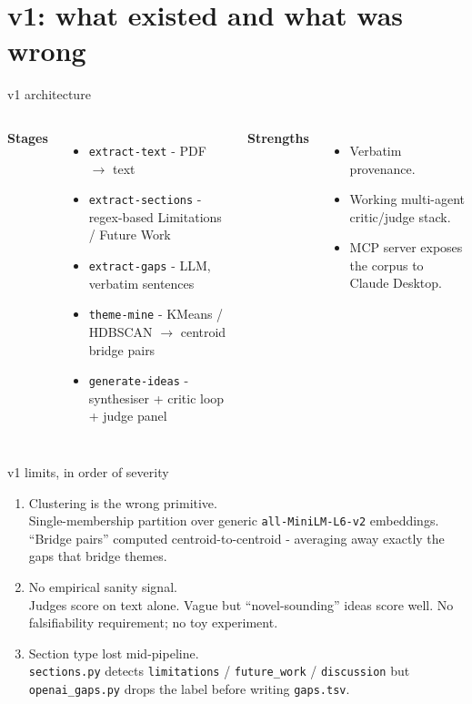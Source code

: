 \documentclass[10pt,aspectratio=169]{beamer}
\newcommand{\filename}[1]{\texttt{\small#1}}
\begin{document}

\section{v1: what existed and what was wrong}

\begin{frame}{v1 architecture}
  \begin{columns}[T]
      \textbf{Stages}
      \begin{itemize}
        \item \filename{extract-text} - PDF $\to$ text
        \item \filename{extract-sections} - regex-based Limitations / Future Work
        \item \filename{extract-gaps} - LLM, verbatim sentences
        \item \filename{theme-mine} - KMeans / HDBSCAN $\to$ centroid bridge pairs
        \item \filename{generate-ideas} - synthesiser + critic loop + judge panel
      \end{itemize}

      \textbf{Strengths}
      \begin{itemize}
        \item Verbatim provenance.
        \item Working multi-agent critic/judge stack.
        \item MCP server exposes the corpus to Claude Desktop.
      \end{itemize}
  \end{columns}
\end{frame}

\begin{frame}{v1 limits, in order of severity}
  \begin{enumerate}
    \item \alert{Clustering is the wrong primitive.}\\
      Single-membership partition over generic \texttt{all-MiniLM-L6-v2}
      embeddings. ``Bridge pairs'' computed centroid-to-centroid -
      averaging away exactly the gaps that bridge themes.
    \item \alert{No empirical sanity signal.}\\
      Judges score on text alone. Vague but ``novel-sounding'' ideas
      score well. No falsifiability requirement; no toy experiment.
    \item \alert{Section type lost mid-pipeline.}\\
      \filename{sections.py} detects \texttt{limitations} / \texttt{future\_work} /
      \texttt{discussion} but \filename{openai\_gaps.py} drops the label
      before writing \filename{gaps.tsv}.
  \end{enumerate}
\end{frame}
\end{document}

